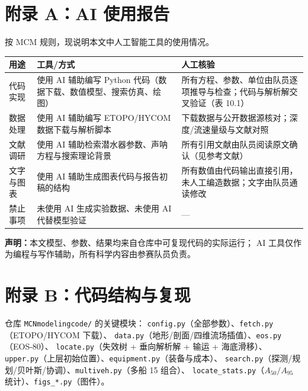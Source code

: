 \section*{附录 A：AI 使用报告}

按 MCM 规则，现说明本文中人工智能工具的使用情况。

\begin{table}[H]
\centering\small
\begin{tabular}{@{}p{}p{}p{}@{}}
\toprule
用途 & 工具/方式 & 人工核验\\
\midrule
代码实现 & 使用 AI 辅助编写 Python 代码（数据下载、数值模型、搜索仿真、绘图） & 
所有方程、参数、单位由队员逐项推导与检查；代码与解析解交叉验证（表 10.1）\\
\addlinespace
数据处理 & 使用 AI 辅助编写 ETOPO/HYCOM 数据下载与解析脚本 & 
下载数据与公开数据源核对；深度/流速量级与文献对照\\
\addlinespace
文献调研 & 使用 AI 辅助检索潜水器参数、声呐方程与搜索理论背景 & 
所有引用文献由队员阅读原文确认（见参考文献）\\
\addlinespace
文字与图表 & 使用 AI 辅助生成图表代码与报告初稿的结构 & 
所有数值由代码输出直接引用，未人工编造数据；文字由队员通读修改\\
\addlinespace
禁止事项 & 未使用 AI 生成实验数据、未使用 AI 代替模型验证 & —\\
\bottomrule
\end{tabular}
\end{table}

\textbf{声明：}本文模型、参数、结果均来自仓库中可复现代码的实际运行；
AI 工具仅作为编程与写作辅助，所有科学内容由参赛队员负责。

\section*{附录 B：代码结构与复现}

\noindent 仓库 \texttt{MCNmodelingcode/} 的关键模块：
\texttt{config.py}（全部参数）、\texttt{fetch.py}（ETOPO/HYCOM 下载）、
\texttt{data.py}（地形/剖面/四维流场插值）、\texttt{eos.py}（EOS-80）、
\texttt{locate.py}（失效树 + 垂向解析解 + 输运 + 海底滑移）、
\texttt{upper.py}（上层初始位置）、\texttt{equipment.py}（装备与成本）、
\texttt{search.py}（探测/规划/贝叶斯/协调）、\texttt{multiveh.py}（多船 15 组合）、
\texttt{locate\_stats.py}（$A_{50}/A_{95}$ 统计）、\texttt{figs\_*.py}（图件）。


